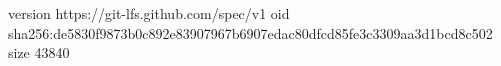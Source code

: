 version https://git-lfs.github.com/spec/v1
oid sha256:de5830f9873b0c892e83907967b6907edac80dfcd85fe3c3309aa3d1bcd8c502
size 43840
